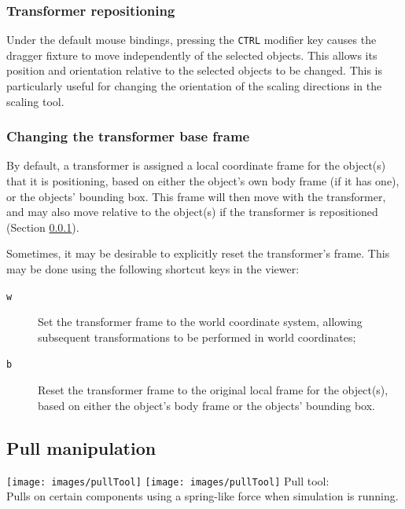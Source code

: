 \documentclass{article}
\begin{document}
\subsubsection{Transformer repositioning}
\label{ChangingTransformerPose}

Under the default mouse bindings, pressing the {\tt CTRL} modifier key
causes the dragger fixture to move independently of the selected
objects. This allows its position and orientation
relative to the selected objects to be changed. This is particularly
useful for changing the orientation of the scaling directions in the
scaling tool.

\subsubsection{Changing the transformer base frame}

By default, a transformer is assigned a local coordinate frame for the
object(s) that it is positioning, based on either the object's own
body frame (if it has one), or the objects' bounding box. This frame
will then move with the transformer, and may also move relative to the
object(s) if the transformer is repositioned (Section
\ref{ChangingTransformerPose}).

Sometimes, it may be desirable to explicitly reset the transformer's
frame. This may be done using the following shortcut keys in the
viewer:

\begin{description}

\item[{\tt w}]\mbox{}

Set the transformer frame to the world coordinate system, allowing
subsequent transformations to be performed in world coordinates;

\item[{\tt b}]\mbox{}

Reset the transformer frame to the original local frame for the
object(s), based on either the object's body frame or the objects'
bounding box.

\end{description}

\subsection{Pull manipulation}
\label{PullControllerSec}

\vspace{\parskip}
\iflatexml
\phantom{.}\texttt{[image: images/pullTool]}
\else
\texttt{[image: images/pullTool]}
\fi
{\sf Pull tool:}\\
Pulls on certain components using a spring-like force
when simulation is running.
\end{document}

